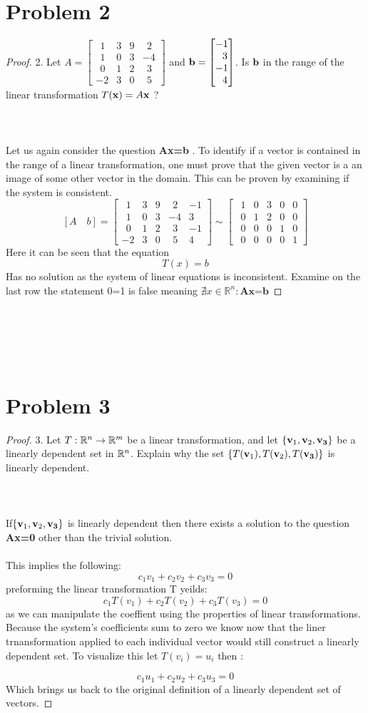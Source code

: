 \documentclass[12pt]{article}
\newcommand{\tab}{\\\\}
\newcommand{\sect}[1]{\section*{#1}}
\newcommand{\R}{\mathbb{R}}
\newcommand{\Axb}{\textbf{Ax=b} }
\newcommand{\Axz}{\textbf{Ax=0} }
\begin{document}
\sect{Problem 2}
\begin{proof}
  2. Let
  $A=\begin{bmatrix}
  ~~1 & 3 & 9 & ~~2\\
  ~~1 & 0 & 3 & -4\\
  ~~0 & 1 & 2 & ~~3\\
  -2 & 3 & 0 & ~~5
  \end{bmatrix}$ and ${\bf b} = \begin{bmatrix} -1 \\ ~~3 \\ -1 \\ ~~4 \end{bmatrix}$. Is ${\bf b}$ in the
  range of the linear transformation $T({\bf x}) = A{\bf x} $ ?
  \tab\tab
  Let us again consider the question \Axb. To identify if a vector is contained in the range of a linear transformation, one must prove that the given vector is a an image of some other vector in the domain. This can be proven by examining if the system is consistent.
  \[
    [A \quad b]= \begin{bmatrix}
    ~~1 & 3 & 9 & ~~2&-1\\
    ~~1 & 0 & 3 & -4&3\\
    ~~0 & 1 & 2 & ~~3&-1\\
    -2 & 3 & 0 & ~~5&4
    \end{bmatrix}
    \sim
    \begin{bmatrix}
    ~~1 & 0 & 3 &0 &0\\
    ~~0 & 1 & 2 & 0&0\\
    ~~0 & 0 & 0 & 1&0\\
    ~~0 & 0 & 0 & 0&1
    \end{bmatrix}
  \]
  Here it can be seen that the equation
  \[
    T(x)=b
  \]
  Has no solution as the system of linear equations is inconsistent. Examine on the last row the statement 0=1 is false meaning $\nexists x \in \R^n : \Axb$
  \noindent
\end{proof}\tab\tab

\sect{Problem 3}
\begin{proof}
  3. Let $T : {\Bbb R}^n \rightarrow {\Bbb R}^m$ be a linear transformation, and let
  $\left\{ {\bf v}_1, {\bf v}_2, {\bf v_3} \right \}$ be a linearly dependent set in ${\Bbb R}^n$. Explain
  why the set $\left\{ T({\bf v}_1), T({\bf v}_2), T({\bf v_3}) \right \}$ is linearly dependent.
  \tab\tab
  If$\left\{ {\bf v}_1, {\bf v}_2, {\bf v_3} \right \}$ is linearly dependent then there exists a solution to the question \Axz other than the trivial solution.\tab
  This implies the following:
  \[
    c_1v_1+c_2v_2+c_3v_3=0
  \]
  preforming the linear transformation T yeilds:
  \[
    c_1T(v_1)+c_2T(v_2)+c_3T(v_3)=0
  \]
  as we can manipulate the coeffient using the properties of linear transformations. Because the system's coefficients sum to zero we know now that the liner trnansformation applied to each individual vector would still construct a linearly dependent set. To visualize this let $T(v_i)=u_i$ then :

  \[
    c_1u_1+c_2u_2+c_3u_3=0
  \]
  Which brings us back to the original definition of a linearly dependent set of vectors.
  \noindent
\end{proof}\tab\tab
\end{document}
